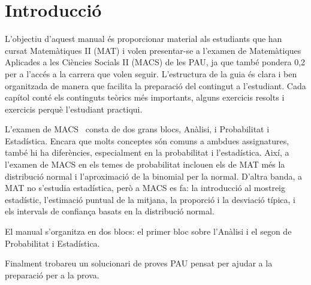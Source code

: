\documentclass[a4paper,12pt]{book}
\renewcommand{\headrulewidth}{0pt}
\begin{document}


\frontmatter

\cleardoublepage


\cleardoublepage
\setcounter{tocdepth}{2}
\renewcommand\contentsname{Índex de continguts}
\tableofcontents
\label{i:tableofcontents}

\mainmatter
\pagestyle{fancy}
\fancyhf{}
\fancyfoot[RE,LO]{\leftmark}
\fancyfoot[LE,RO]{\thepage}
\renewcommand{\headrulewidth}{2pt}
\renewcommand{\footrulewidth}{1pt}

\chapter*{Introducció}

L'objectiu d'aquest manual és proporcionar material als estudiants que han cursat Matemàtiques II (MAT) i volen presentar-se a l’examen de Matemàtiques Aplicades a les Ciències Socials II (MACS) de les PAU, ja que també pondera 0,2 per a l’accés a la carrera que volen seguir. L'estructura de la guia és clara i ben organitzada de manera que facilita la preparació del contingut a l'estudiant. Cada capítol conté els continguts teòrics més importants, alguns exercicis resolts i exercicis perquè l'estudiant practiqui.

L'examen de MACS~\cite{Temari-macs} consta de dos grans blocs, Anàlisi, i Probabilitat i Estadística. Encara que molts conceptes són comuns a ambdues assignatures, també hi ha diferències, especialment en la probabilitat i l'estadística. Així, a l'examen de MACS en els temes de probabilitat inclouen els de MAT més la distribució normal i l'aproximació de la binomial per la normal. D'altra banda, a MAT no s'estudia estadística, però a MACS es fa: la introducció al mostreig estadístic, l'estimació puntual de la mitjana, la proporció i la desviació típica, i els intervals de confiança basats en la distribució normal.

El manual s'organitza en dos blocs: el primer bloc sobre l’Anàlisi i el segon de Probabilitat i Estadística.

Finalment trobareu un solucionari de proves PAU pensat per ajudar a la preparació per a la prova.





\appendix






\renewcommand\bibname{Bibliografia}


\label{b:bibliography}

\end{document}
